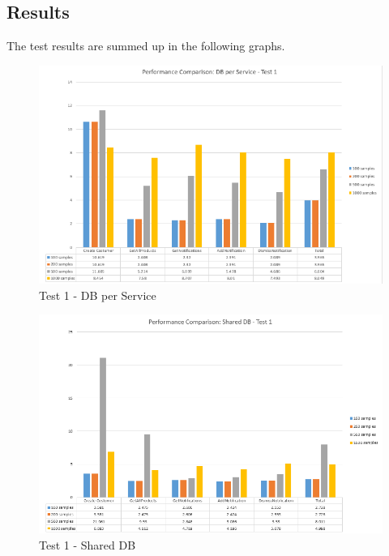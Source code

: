 \documentclass{article}
\begin{document}
\bigbreak

\subsection{Results}

The test results are summed up in the following graphs.
\bigbreak

\begin{figure}[h!]
\centering
\includegraphics[scale=0.70]{Test_Results/test_1_DB_per_Service.PNG}
\caption{Test 1 - DB per Service}
\label{fig:test_1_DB_per_Service}
\end{figure}

\pagebreak

\begin{figure}[h!]
\centering
\includegraphics[scale=0.60]{Test_Results/test_1_shared_DB.PNG}
\caption{Test 1 - Shared DB}
\label{fig:test_1_shared_DB}
\end{figure}
\end{document}
